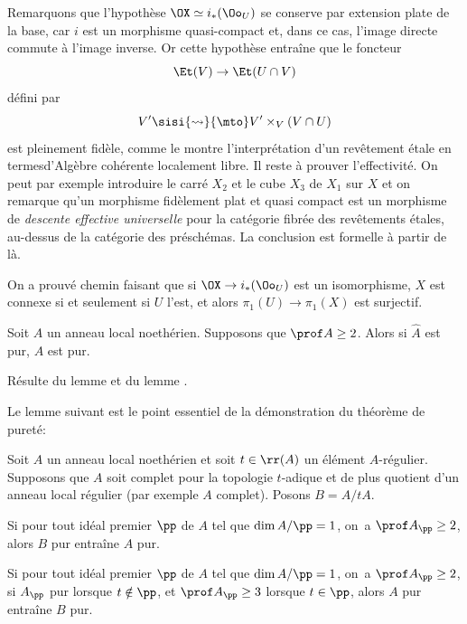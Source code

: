 Remarquons que l'hypoth\`ese $\OX\simeq i_\ast(\Oo_U)$ se conserve par extension plate de la base, car $i$ est un morphisme quasi-compact et, dans ce cas, l'image directe commute \`a l'image inverse. Or cette hypoth\`ese entra\^ine que le foncteur
\[
\Et(V) \to \Et(U\cap V)
\]
d\'efini par
\[
V'\sisi{\rightsquigarrow}{\mto} V'\times_V(V\cap U)
\]
est pleinement fid\`ele, comme le montre l'interpr\'etation d'un rev\^etement \'etale en termes\pageoriginale d'Alg\`ebre coh\'erente localement libre. Il reste \`a prouver l'effectivit\'e. On peut par exemple introduire le carr\'e $X_2$ et le cube $X_3$ de $X_1$ sur $X$ et on remarque qu'un morphisme fid\`element plat et quasi compact est un morphisme de \emph{descente effective universelle} pour la cat\'egorie fibr\'ee des rev\^etements \'etales, au-dessus de la cat\'egorie des pr\'esch\'emas. La conclusion est formelle \`a partir de l\`a.

\begin{remarque} \label{X.3.7}
On a prouv\'e chemin faisant que si $\OX\to i_\ast(\Oo_U)$ est un isomorphisme, $X$ est connexe si et seulement si $U$ l'est, et alors $\pi_1(U)\to\pi_1(X)$ est surjectif.
\end{remarque}

\begin{corollaire} \label{X.3.8}
Soit $A$ un anneau local noeth\'erien. Supposons que $\prof A\geq 2$. Alors si $\hat{A}$ est pur, $A$ est pur.
\end{corollaire}

R\'esulte du lemme  et du lemme .

Le lemme suivant est le point essentiel de la d\'emonstration du th\'eor\`eme de puret\'e:

\begin{lemme} \label{X.3.9}
Soit $A$ un anneau local noeth\'erien et soit $t\in\rr(A)$ un \'el\'ement $A$-r\'egulier. Supposons que $A$ soit complet pour la topologie $t$-adique et de plus quotient d'un anneau local r\'egulier (par exemple $A$ complet). Posons $B=A/tA$.
\begin{enumeratei}
\item
Si pour tout id\'eal premier $\pp$ de $A$ tel que $\dim A/\pp=1$, on~a $\prof A_{\pp}\geq 2$, alors $B$ pur entra\^ine $A$ pur.

\item
Si pour tout id\'eal premier $\pp$ de $A$ tel que $\dim A/\pp=1$, on~a $\prof A_{\pp}\geq 2$, si $A_\pp$ pur lorsque $t\notin\pp$, et  $\prof A_\pp\geq3$ lorsque $t\in\pp$, alors $A$ pur entra\^ine $B$ pur.
\end{enumeratei}
\end{lemme}

